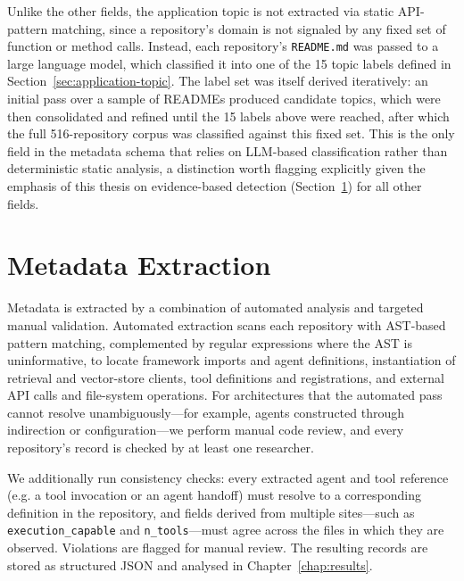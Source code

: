 
Unlike the other fields, the application topic is not extracted via
static API-pattern matching, since a repository's domain is not signaled
by any fixed set of function or method calls. Instead, each repository's
\texttt{README.md} was passed to a large language model, which classified
it into one of the 15 topic labels defined in Section~\ref{sec:application-topic}.
The label set was itself derived iteratively: an initial pass over a sample
of READMEs produced candidate topics, which were then consolidated and
refined until the 15 labels above were reached, after which the full
516-repository corpus was classified against this fixed set. This is the
only field in the metadata schema that relies on LLM-based
classification rather than deterministic static analysis, a distinction
worth flagging explicitly given the emphasis of this thesis on
evidence-based detection (Section~\ref{sec:extraction-methodology})
for all other fields.

\section{Metadata Extraction}
\label{sec:extraction-methodology}
 
Metadata is extracted by a combination of automated analysis and targeted manual validation. Automated extraction scans each repository with AST-based pattern matching, complemented by regular expressions where the AST is uninformative, to locate framework imports and agent definitions, instantiation of retrieval and vector-store clients, tool definitions and registrations, and external API calls and file-system operations. For architectures that the automated pass cannot resolve unambiguously---for example, agents constructed through indirection or configuration---we perform manual code review, and every repository's record is checked by at least one researcher. 

We additionally run consistency checks: every extracted agent and tool reference (e.g. a tool invocation or an agent handoff) must resolve to a corresponding definition in the repository, and fields derived from multiple sites—such as \texttt{execution\_capable} and \texttt{n\_tools}—must agree across the files in which they are observed. Violations are flagged for manual review.
The resulting records are stored as structured JSON and analysed in Chapter~\ref{chap:results}.

